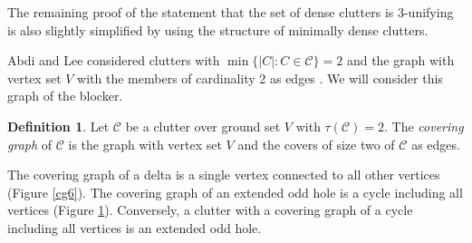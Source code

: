\documentclass[a4paper, 12pt]{scrbook}
\theoremstyle{definition}
\newtheorem*{definition}{Definition}
\begin{document}
The remaining proof of the statement that the set of dense clutters is 3-unifying is also slightly simplified by using the structure of minimally dense clutters.
\newline

Abdi and Lee considered clutters with $\min\{|C|:C\in \mathcal{C}\}=2$ and the graph with vertex set $V$ with the members of cardinality 2 as edges \cite{deltas}. We will consider this graph of the blocker.

   \begin{definition}
       Let $\mathcal{C}$ be a clutter over ground set $V$ with $\tau(\mathcal{C})=2$.
       The \emph{covering graph} of $\mathcal{C}$ is the graph with vertex set $V$ and the covers of size two of $\mathcal{C}$ as edges.
   \end{definition}
   The covering graph of a delta is a single vertex connected to all other vertices (Figure \ref*{cg6}).
   The covering graph of an extended odd hole is a cycle including all vertices (Figure \ref*{cg5}). Conversely, a clutter with a covering graph of a cycle including all vertices is an extended odd hole.

    \begin{figure}[h]
        \centering
        \begin{minipage}{.4\textwidth}
            \centering
            \label{cg6}
        \end{minipage}
        \begin{minipage}{.5\textwidth}
            \centering
            \label{cg5}
        \end{minipage}
    \end{figure}
\end{document}
